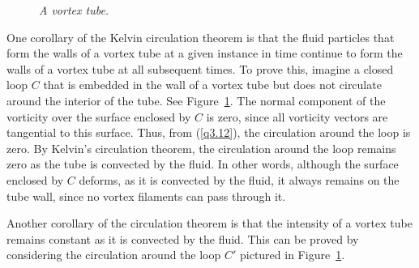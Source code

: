 \begin{figure}
\epsfysize=2.5in
\centerline{}
\caption{\em A vortex tube.}\label{fkelvin}
\end{figure}

One corollary of the Kelvin circulation theorem is that the fluid particles that form the walls of a vortex tube at a given instance in time continue to
form the walls of a vortex tube at all subsequent times. To prove this, imagine a closed loop $C$ that is embedded in the wall of a vortex tube but does
not circulate around the interior of the tube. See Figure~\ref{fkelvin}. The normal component of the
vorticity over the surface enclosed by $C$ is zero, since all vorticity vectors are tangential to this surface.
Thus, from (\ref{q3.12}), the circulation around the loop is zero. By Kelvin's circulation theorem, the circulation around the loop remains zero as the
tube is convected by the fluid. In other words, although the
surface enclosed by $C$  deforms, as it is convected by the fluid, it always remains on the  tube wall, since
no vortex filaments can pass through it. 

Another corollary of the circulation theorem is that the intensity of a vortex tube remains constant as it
is convected by the fluid. This can be proved by considering the circulation around the loop $C'$ pictured
in Figure~\ref{fkelvin}. 

